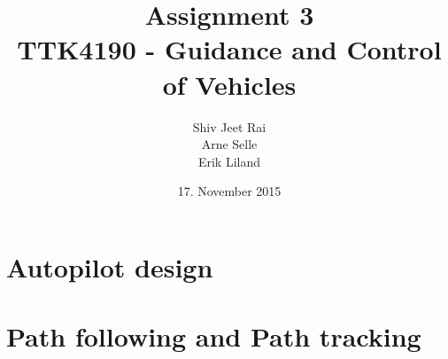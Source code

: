 \documentclass[11pt,a4paper,USenglish]{article}
\title{Assignment 3 \\TTK4190 - Guidance and Control of Vehicles}
\date{17. November 2015}
\author{Shiv Jeet Rai \\ Arne Selle \\ Erik Liland}
\begin{document}
 
\maketitle
\tableofcontents

\newpage
\section{Autopilot design}\label{sec:prob1}


\newpage
\section{Path following and Path tracking}\label{sec:prob2}

\newpage

\newpage


\clearpage


\end{document}
